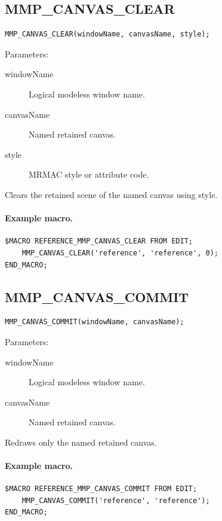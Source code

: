 \documentclass[a4paper,10pt,twoside,openany]{book}
\newenvironment{mrmacextension}{\begin{changebar}}{\end{changebar}}
\begin{document}
\begin{mrmacextension}
\label{prim:procedure-mmp-canvas-clear}
\subsection*{MMP\_CANVAS\_CLEAR}
\begin{verbatim}
MMP_CANVAS_CLEAR(windowName, canvasName, style);
\end{verbatim}
Parameters:
\begin{description}
\item[windowName] Logical modeless window name.
\item[canvasName] Named retained canvas.
\item[style] MRMAC style or attribute code.
\end{description}

Clears the retained scene of the named canvas using style.

\paragraph{Example macro.}
\begin{verbatim}
$MACRO REFERENCE_MMP_CANVAS_CLEAR FROM EDIT;
    MMP_CANVAS_CLEAR('reference', 'reference', 0);
END_MACRO;
\end{verbatim}
\end{mrmacextension}

\begin{mrmacextension}
\label{prim:procedure-mmp-canvas-commit}
\subsection*{MMP\_CANVAS\_COMMIT}
\begin{verbatim}
MMP_CANVAS_COMMIT(windowName, canvasName);
\end{verbatim}
Parameters:
\begin{description}
\item[windowName] Logical modeless window name.
\item[canvasName] Named retained canvas.
\end{description}

Redraws only the named retained canvas.

\paragraph{Example macro.}
\begin{verbatim}
$MACRO REFERENCE_MMP_CANVAS_COMMIT FROM EDIT;
    MMP_CANVAS_COMMIT('reference', 'reference');
END_MACRO;
\end{verbatim}
\end{mrmacextension}
\end{document}
